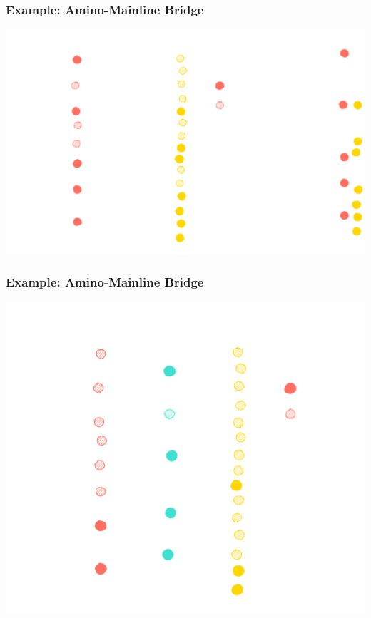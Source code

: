 \documentclass{../shipyard-slide}
\begin{document}
\begin{frame}
\frametitle{Example: Amino-Mainline Bridge}

\hspace{2cm}\includegraphics[scale=.13]{resources/rt1-1.png}

\end{frame}

\begin{frame}
\frametitle{Example: Amino-Mainline Bridge}

\hspace{2cm}\includegraphics[scale=.13]{resources/rt2-0.png}

\end{frame}
\end{document}
